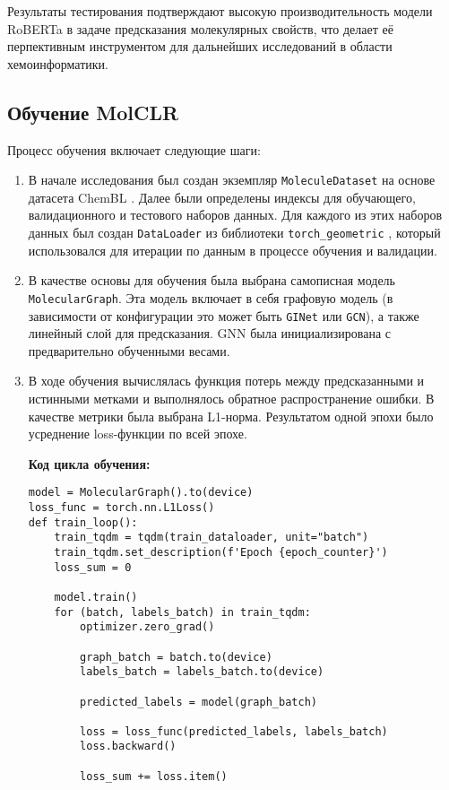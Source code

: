 Результаты тестирования подтверждают высокую производительность модели RoBERTa в задаче предсказания молекулярных свойств, что делает её перпективным инструментом для дальнейших исследований в области хемоинформатики.

\subsection{Обучение MolCLR}
Процесс обучения включает следующие шаги:
\begin{enumerate}
\item В начале исследования был создан экземпляр \texttt{MoleculeDataset} на основе датасета ChemBL \cite{ChemBL}. Далее были определены индексы для обучающего, валидационного и тестового наборов данных. Для каждого из этих наборов данных был создан \texttt{DataLoader} из библиотеки \texttt{torch\_geometric} \cite{torch_geometric}, который использовался для итерации по данным в процессе обучения и валидации.

\item В качестве основы для обучения была выбрана самописная модель \texttt{MolecularGraph}. Эта модель включает в себя графовую модель (в зависимости от конфигурации это может быть \texttt{GINet} или \texttt{GCN}), а также линейный слой для предсказания. GNN была инициализирована с предварительно обученными весами.

\item В ходе обучения вычислялась функция потерь между предсказанными и истинными метками и выполнялось обратное распространение ошибки. В качестве метрики была выбрана L1-норма. Результатом одной эпохи было усреднение loss-функции по всей эпохе.

\newpage
\textbf{Код цикла обучения:}
\begin{lstlisting}
model = MolecularGraph().to(device)
loss_func = torch.nn.L1Loss()
def train_loop():
    train_tqdm = tqdm(train_dataloader, unit="batch")
    train_tqdm.set_description(f'Epoch {epoch_counter}')
    loss_sum = 0
    
    model.train()
    for (batch, labels_batch) in train_tqdm:
        optimizer.zero_grad()

        graph_batch = batch.to(device)
        labels_batch = labels_batch.to(device)

        predicted_labels = model(graph_batch)

        loss = loss_func(predicted_labels, labels_batch)
        loss.backward()

        loss_sum += loss.item()


\end{lstlisting}
\end{enumerate}
